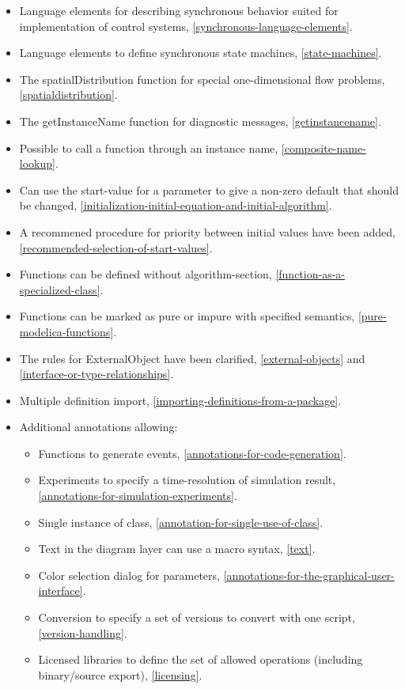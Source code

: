 \documentclass[10pt,a4paper]{report}
\begin{document}
\begin{itemize}
\item
  Language elements for describing synchronous behavior suited for
  implementation of control systems, \ref{synchronous-language-elements}.
\item
  Language elements to define synchronous state machines, \ref{state-machines}.
\item
  The spatialDistribution function for special one-dimensional flow
  problems, \ref{spatialdistribution}.
\item
  The getInstanceName function for diagnostic messages, \ref{getinstancename}.
\item
  Possible to call a function through an instance name, \ref{composite-name-lookup}.
\item
  Can use the start-value for a parameter to give a non-zero default
  that should be changed, \ref{initialization-initial-equation-and-initial-algorithm}.
\item
  A recommened procedure for priority between initial values have been
  added, \ref{recommended-selection-of-start-values}.
\item
  Functions can be defined without algorithm-section, \ref{function-as-a-specialized-class}.
\item
  Functions can be marked as pure or impure with specified semantics,
  \ref{pure-modelica-functions}.
\item
  The rules for ExternalObject have been clarified, \ref{external-objects} and
  \ref{interface-or-type-relationships}.
\item
  Multiple definition import, \ref{importing-definitions-from-a-package}.
\item
  Additional annotations allowing:

  \begin{itemize}
  \item
    Functions to generate events, \ref{annotations-for-code-generation}.
  \item
    Experiments to specify a time-resolution of simulation result,
    \ref{annotations-for-simulation-experiments}.
  \item
    Single instance of class, \ref{annotation-for-single-use-of-class}.
  \item
    Text in the diagram layer can use a macro syntax, \ref{text}.
  \item
    Color selection dialog for parameters, \ref{annotations-for-the-graphical-user-interface}.
  \item
    Conversion to specify a set of versions to convert with one script,
    \ref{version-handling}.
  \item
    Licensed libraries to define the set of allowed operations
    (including binary/source export), \ref{licensing}.
  \end{itemize}
\end{itemize}
\end{document}
